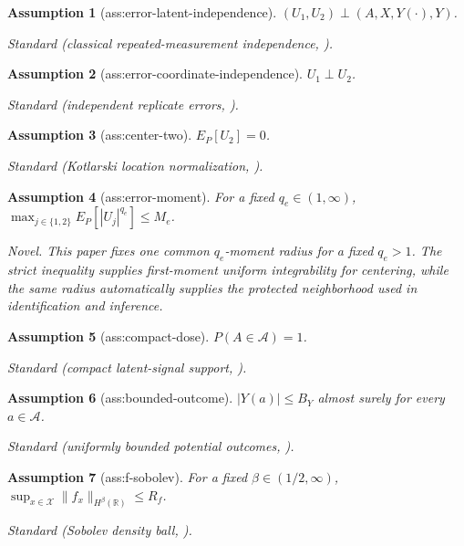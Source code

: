 \documentclass{article}
\newtheorem{assumption}{Assumption}
\begin{document}
\begin{assumption}[ass:error-latent-independence]\label{ass:error-latent-independence}
\((U_1,U_2)\perp(A,X,Y(\cdot),Y)\).
\par\smallskip\noindent\emph{Standard} (classical repeated-measurement independence, \cite{CapitaoMiniconiGassiatLehericy2025}).
\end{assumption}

\begin{assumption}[ass:error-coordinate-independence]\label{ass:error-coordinate-independence}
\(U_1\perp U_2\).
\par\smallskip\noindent\emph{Standard} (independent replicate errors, \cite{CapitaoMiniconiGassiatLehericy2025}).
\end{assumption}

\begin{assumption}[ass:center-two]\label{ass:center-two}
\(E_P[U_2]=0\).
\par\smallskip\noindent\emph{Standard} (Kotlarski location normalization, \cite{KatoSasakiUra2021}).
\end{assumption}

\begin{assumption}[ass:error-moment]\label{ass:error-moment}
For a fixed \(q_e\in(1,\infty)\), \(\max_{j\in\{1,2\}}E_P[|U_j|^{q_e}]\le M_e\).
\par\smallskip\noindent\emph{Novel.} This paper fixes one common \(q_e\)-moment radius for a fixed \(q_e>1\). The strict inequality supplies first-moment uniform integrability for centering, while the same radius automatically supplies the protected neighborhood used in identification and inference.
\end{assumption}

\begin{assumption}[ass:compact-dose]\label{ass:compact-dose}
\(P(A\in\mathcal A)=1\).
\par\smallskip\noindent\emph{Standard} (compact latent-signal support, \cite{CapitaoMiniconiGassiatLehericy2025}).
\end{assumption}

\begin{assumption}[ass:bounded-outcome]\label{ass:bounded-outcome}
\(|Y(a)|\le B_Y\) almost surely for every \(a\in\mathcal A\).
\par\smallskip\noindent\emph{Standard} (uniformly bounded potential outcomes, \cite{HuangZhang2023}).
\end{assumption}

\begin{assumption}[ass:f-sobolev]\label{ass:f-sobolev}
For a fixed \(\beta\in(1/2,\infty)\), \(\sup_{x\in\mathcal X}\|f_x\|_{H^{\beta}(\mathbb R)}\le R_f\).
\par\smallskip\noindent\emph{Standard} (Sobolev density ball, \cite{CapitaoMiniconiGassiatLehericy2025}).
\end{assumption}
\end{document}
